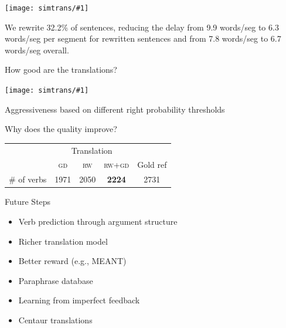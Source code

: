 \documentclass[aspectratio=169,xcolor=dvipsnames]{beamer}
\newcommand{\abr}[1]{\textsc{#1} }
\newcommand{\gfxs}[2]{
\begin{center}
	\texttt{[image: simtrans/\#1]}
\end{center}
}
\begin{document}
\begin{frame}{}

\gfxs{rewrite_eval}{.8}
\pause
We rewrite 32.2\% of
sentences, reducing the delay from 9.9 words/seg to 6.3 words/seg per
segment for rewritten sentences and from 7.8 words/seg to 6.7 words/seg overall.

\end{frame}

\begin{frame}{How good are the translations?}

  \gfxs{tradeoff-rw-bleu}{.7}

\begin{center}
Aggressiveness based on different right probability thresholds
\cite{fujita-13}
\end{center}

\end{frame}

\begin{frame}{Why does the quality improve?}

\begin{center}
\begin{tabular}{ccccc}
\toprule
& \multicolumn{3}{c}{Translation} & \\
\cmidrule{2-4}
& \abr{gd} & \abr{rw} & \abr{rw+gd} & Gold ref \\
\midrule
\# of verbs & 1971 & 2050 & {\bf 2224} & 2731 \\
\bottomrule
\end{tabular}
\end{center}

\end{frame}

\begin{frame}{Future Steps}

  \begin{itemize}
    \item Verb prediction through argument structure 
    \item Richer translation model~\cite{oda-15,cho-16}
    \item Better reward (e.g., MEANT)  
    \item Paraphrase database
    \item Learning from imperfect feedback  
    \item Centaur translations  
  \end{itemize}

\end{frame}
\end{document}

